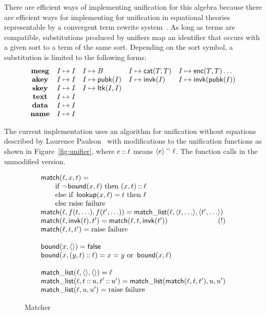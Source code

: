 \documentclass[12pt]{report}
\theoremstyle{definition}
\begin{document}
There are efficient ways of implementing unification for this algebra
because there are efficient ways for implementing for unification in
equational theories representable by a convergent term rewrite
system~\cite{Fay79}. As long as terms are compatible, substitutions
produced by unifiers map an identifier that occurs with a given sort to a
term of the same sort.  Depending on the sort symbol, a substitution is
limited to the following forms:
$$
\begin{array}{cllll}
\operatorname{\mathbf{mesg}}&I\mapsto I&I\mapsto B
&I\mapsto\operatorname{\mathsf{cat}}(T,T)&I\mapsto\operatorname{\mathsf{enc}}(T,T)\ldots\\
\operatorname{\mathbf{akey}}&I\mapsto I&I\mapsto\operatorname{\mathsf{pubk}}(I)
&I\mapsto\operatorname{\mathsf{invk}}(I)&I\mapsto\operatorname{\mathsf{invk}}(\operatorname{\mathsf{pubk}}(I))\\
\operatorname{\mathbf{skey}}&I\mapsto I&I\mapsto\operatorname{\mathsf{ltk}}(I, I)\\
\operatorname{\mathbf{text}}&I\mapsto I\\
\operatorname{\mathbf{data}}&I\mapsto I\\
\operatorname{\mathbf{name}}&I\mapsto I
\end{array}
$$

The current implementation uses an algorithm for unification without
equations described by Laurence Paulson~\cite[Page~381]{Paulson91}
with modifications to the unification functions as shown in
Figure~\ref{fig:unifier}, where $e\mathbin{::}\ell$ means
$\langle e\rangle\mathbin{{}^\smallfrown}\ell$.  The function  calls 
in the unmodified version.

\begin{figure}
$$
\begin{array}{l}
\cn{match}(\ell,x,t) =
\\\qquad\mbox{if }\lnot\cn{bound}(x, \ell)\mbox{ then }(x,t)\cons\ell
\\\qquad\mbox{else if } \cn{lookup}(x,\ell)= t\mbox{ then }\ell
\\\qquad\mbox{else raise failure}
\\\cn{match}(\ell,f(t,\ldots),f(t',\ldots)) =
\cn{match\_list}(\ell,\seq{t,\ldots},\seq{t',\ldots})
\\\cn{match}(\ell,\cn{invk}(t),t') = \cn{match}(\ell,t,\cn{invk}(t'))\hfill(!)
\\\cn{match}(\ell,t,t') =\mbox{raise failure}
\\
\\\cn{bound}(x,\seq{})=\cn{false}
\\\cn{bound}(x,(y,t)\cons\ell)=
x=y\mbox{ or }\cn{bound}(x, \ell)
\\
\\\cn{match\_list}(\ell,\seq{},\seq{}) =\ell
\\\cn{match\_list}(\ell,t\cons u,t'\cons u') =
\cn{match\_list}(\cn{match}(\ell,t,t'), u, u')
\\\cn{match\_list}(\ell,u,u') =\mbox{raise failure}
\end{array}
$$
\caption{Matcher}\label{fig:matcher}
\end{figure}




\printindex
\end{document}
